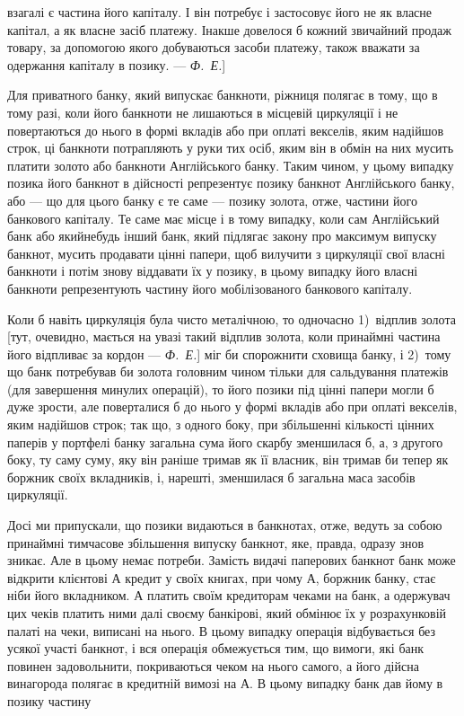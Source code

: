 \parcont{}  %
взагалі є частина його капіталу. І він потребує і застосовує його
не як власне капітал, а як власне засіб платежу. Інакше довелося
б кожний звичайний продаж товару, за допомогою якого
добуваються засоби платежу, також вважати за одержання капіталу
в позику. — \emph{Ф.~Е.}]

Для приватного банку, який випускає банкноти, ріжниця полягає
в тому, що в тому разі, коли його банкноти не лишаються
в місцевій циркуляції і не повертаються до нього в формі
вкладів або при оплаті векселів, яким надійшов строк, ці банкноти
потрапляють у руки тих осіб, яким він в обмін на них
мусить платити золото або банкноти Англійського банку.
Таким чином, у цьому випадку позика його банкнот в дійсності
репрезентує позику банкнот Англійського банку, або — що для
цього банку є те саме — позику золота, отже, частини його
банкового капіталу. Те саме має місце і в тому випадку, коли
сам Англійський банк або якийнебудь інший банк, який підлягає
закону про максимум випуску банкнот, мусить продавати
цінні папери, щоб вилучити з циркуляції свої власні банкноти
і потім знову віддавати їх у позику, в цьому випадку
його власні банкноти репрезентують частину його мобілізованого
банкового капіталу.

Коли б навіть циркуляція була чисто металічною, то одночасно
1)~відплив золота [тут, очевидно, мається на увазі такий
відплив золота, коли принаймні частина його відпливає за кордон
— \emph{Ф.~Е.}] міг би спорожнити сховища банку, і 2)~тому що
банк потребував би золота головним чином тільки для сальдування
платежів (для завершення минулих операцій), то його позики
під цінні папери могли б дуже зрости, але поверталися б до
нього у формі вкладів або при оплаті векселів, яким надійшов
строк; так що, з одного боку, при збільшенні кількості цінних
паперів у портфелі банку загальна сума його скарбу зменшилася
б, а, з другого боку, ту саму суму, яку він раніше тримав
як її власник, він тримав би тепер як боржник своїх вкладників,
і, нарешті, зменшилася б загальна маса засобів циркуляції.

Досі ми припускали, що позики видаються в банкнотах,
отже, ведуть за собою принаймні тимчасове збільшення випуску
банкнот, яке, правда, одразу знов зникає. Але в цьому
немає потреби. Замість видачі паперових банкнот банк може
відкрити клієнтові $А$ кредит у своїх книгах, при чому $А$, боржник
банку, стає ніби його вкладником. $А$ платить своїм кредиторам
чеками на банк, а одержувач цих чеків платить ними
далі своєму банкірові, який обмінює їх у розрахунковій палаті на
чеки, виписані на нього. В цьому випадку операція відбувається
без усякої участі банкнот, і вся операція обмежується тим, що
вимоги, які банк повинен задовольнити, покриваються чеком на
нього самого, а його дійсна винагорода полягає в кредитній вимозі
на $А$. В цьому випадку банк дав йому в позику частину
\parbreak{}  %
